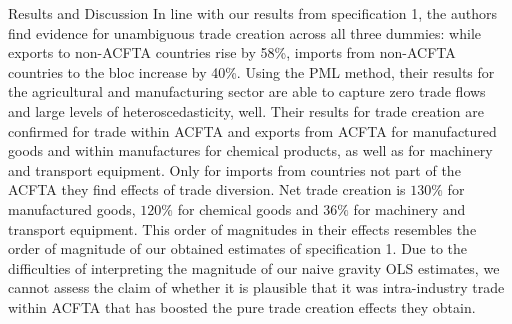 \begin{section}{Results and Discussion}
In line with our results from specification 1, the authors find evidence for unambiguous trade creation across all three dummies: while exports to non-ACFTA countries rise by 58\%, imports from non-ACFTA countries to the bloc increase by 40\%. Using the PML method, their results for the agricultural and manufacturing sector are able to capture zero trade flows and large levels of heteroscedasticity, well. Their results for trade creation are confirmed for trade within ACFTA and exports from ACFTA for manufactured goods and within manufactures for chemical products, as well as for machinery and transport equipment. Only for imports from countries not part of the ACFTA they find effects of trade diversion. Net trade creation is $130\%$ for manufactured goods, $120\%$ for chemical goods and $36\%$ for machinery and transport equipment. This order of magnitudes in their effects resembles the order of magnitude of our obtained estimates of specification 1. Due to the difficulties of interpreting the magnitude of our naive gravity OLS estimates, we cannot assess the claim of \cite{wla_2021} whether it is plausible that it was intra-industry trade within ACFTA that has boosted the pure trade creation effects they obtain.

\end{section}

